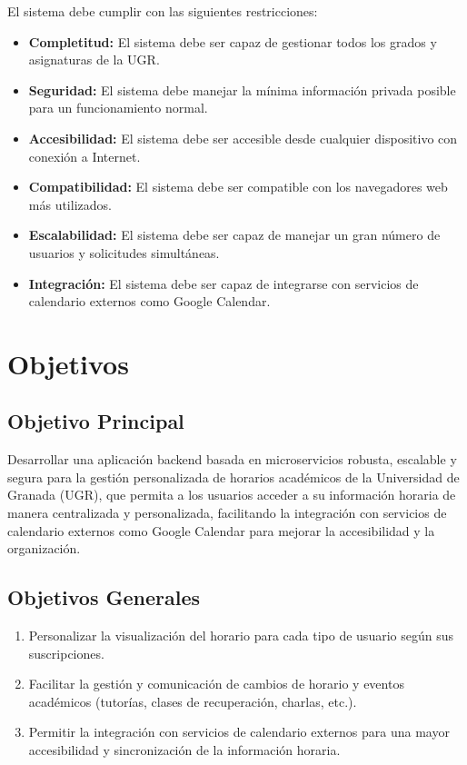 El sistema debe cumplir con las siguientes restricciones:

\begin{itemize}
    \item \textbf{Completitud:} El sistema debe ser capaz de gestionar todos los grados y asignaturas de la UGR.
    \item \textbf{Seguridad:} El sistema debe manejar la mínima información privada posible para un funcionamiento normal.
    \item \textbf{Accesibilidad:} El sistema debe ser accesible desde cualquier dispositivo con conexión a Internet.
    \item \textbf{Compatibilidad:} El sistema debe ser compatible con los navegadores web más utilizados.
    \item \textbf{Escalabilidad:} El sistema debe ser capaz de manejar un gran número de usuarios y solicitudes simultáneas.
    \item \textbf{Integración:} El sistema debe ser capaz de integrarse con servicios de calendario externos como Google Calendar.
\end{itemize}

\section{Objetivos}

\subsection{Objetivo Principal}

Desarrollar una aplicación backend basada en microservicios robusta, escalable y segura para la gestión personalizada de horarios académicos de la Universidad de Granada (UGR), que permita a los usuarios acceder a su información horaria de manera centralizada y personalizada, facilitando la integración con servicios de calendario externos como Google Calendar para mejorar la accesibilidad y la organización.

\subsection{Objetivos Generales}

\begin{enumerate}
    \item Personalizar la visualización del horario para cada tipo de usuario según sus suscripciones.
    \item Facilitar la gestión y comunicación de cambios de horario y eventos académicos (tutorías, clases de recuperación, charlas, etc.).
    \item Permitir la integración con servicios de calendario externos para una mayor accesibilidad y sincronización de la información horaria.
\end{enumerate}


